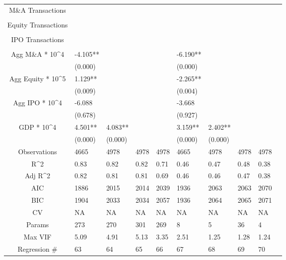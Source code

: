 \documentclass{article}
\begin{document}
\begin{table}[H]
\begin{tabular}{|clllllllll|}
  M\&A Transactions &  &  &  &  &  &  &  &  & \\ 
   &  &  &  &  &  &  &  &  & \\ 
  Equity Transactions &  &  &  &  &  &  &  &  & \\ 
   &  &  &  &  &  &  &  &  & \\ 
  IPO Transactions &  &  &  &  &  &  &  &  & \\ 
   &  &  &  &  &  &  &  &  & \\ 
  Agg M\&A * 10^4 & -4.105** &  &  &  & -6.190** &  &  &  & \\ 
   & (0.000) &  &  &  & (0.000) &  &  &  & \\ 
  Agg Equity * 10^5 & 1.129** &  &  &  & -2.265** &  &  &  & \\ 
   & (0.009) &  &  &  & (0.004) &  &  &  & \\ 
  Agg IPO * 10^4 & -6.088 &  &  &  & -3.668 &  &  &  & \\ 
   & (0.678) &  &  &  & (0.927) &  &  &  & \\ 
  GDP * 10^4 & 4.501** & 4.083** &  &  & 3.159** & 2.402** &  &  & \\ 
   & (0.000) & (0.000) &  &  & (0.000) & (0.000) &  &  & \\ 
  \hline 
 Observations & 4665 & 4978 & 4978 & 4978 & 4665 & 4978 & 4978 & 4978 & \\ 
  R^2 & 0.83 & 0.82 & 0.82 & 0.71 & 0.46 & 0.47 & 0.48 & 0.38 & \\ 
  Adj R^2 & 0.82 & 0.81 & 0.81 & 0.69 & 0.46 & 0.46 & 0.47 & 0.38 & \\ 
  AIC & 1886 & 2015 & 2014 & 2039 & 1936 & 2063 & 2063 & 2070 & \\ 
  BIC & 1904 & 2033 & 2034 & 2057 & 1936 & 2064 & 2065 & 2071 & \\ 
  CV & NA & NA & NA & NA & NA & NA & NA & NA & \\ 
  Params & 273 & 270 & 301 & 269 & 8 & 5 & 36 & 4 & \\ 
  Max VIF & 5.09 & 4.91 & 5.13 & 3.35 & 2.51 & 1.25 & 1.28 & 1.24 & \\ 
  Regression \# & 63 & 64 & 65 & 66 & 67 & 68 & 69 & 70 & \\ 
   \hline
\end{tabular}
 
\end{table}
\end{document}
